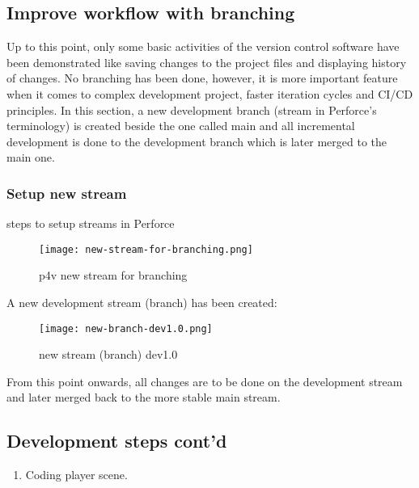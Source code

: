 \subsection{Improve workflow with branching}
Up to this point, only some basic activities of the version control software have been
demonstrated like saving changes to the project files and displaying history of changes. No branching
has been done, however, it is more important feature when it comes to complex development project, faster iteration cycles and
CI/CD principles. In this section, a new development branch (stream in Perforce's terminology) is created beside the one
called main and all incremental development is done to the development branch which is later merged to the main one.
\subsubsection{Setup new stream}
steps to setup streams in Perforce
\begin{figure}[H]
    \centering
    \texttt{[image: new-stream-for-branching.png]}
      \caption{p4v new stream for branching}
      \label{fig:new-stream-for-branching}
\end{figure}
A new development stream (branch) has been created:
\begin{figure}[H]
    \centering
    \texttt{[image: new-branch-dev1.0.png]}
      \caption{new stream (branch) dev1.0}
      \label{fig:new-branch-dev1.0}
\end{figure}
From this point onwards, all changes are to be done on the development stream and later merged back to the more stable
main stream.

\subsection{Development steps cont'd}
\begin{enumerate}[resume]
    \item Coding player scene.
\end{enumerate}